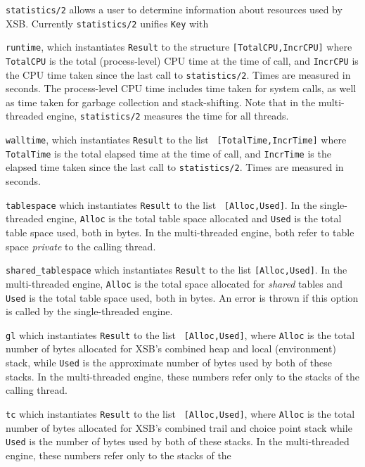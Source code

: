 \begin{description}
%
{\tt statistics/2} allows a user to determine information about
resources used by XSB.  Currently {\tt statistics/2} unifies {\tt Key}
with
\bi
\item {\tt runtime}, which instantiates {\tt Result} to the structure
  {\tt [TotalCPU,IncrCPU]} where {\tt TotalCPU} is the total
  (process-level) CPU time at the time of call, and {\tt IncrCPU} is
  the CPU time taken since the last call to {\tt statistics/2}.  Times
  are measured in seconds.  The process-level CPU time includes time
  taken for system calls, as well as time taken for garbage collection
  and stack-shifting.  Note that in the multi-threaded engine,
  {\tt statistics/2} measures the time for all threads.
%
\item {\tt walltime}, which instantiates {\tt Result} to the list {\tt
 [TotalTime,IncrTime]} where {\tt TotalTime} is the total elapsed time
 at the time of call, and {\tt IncrTime} is the elapsed time taken
 since the last call to {\tt statistics/2}.  Times are measured in
 seconds.
%
\item {\tt tablespace} which instantiates {\tt Result} to the list {\tt
 [Alloc,Used]}.  In the single-threaded engine, {\tt Alloc} is the
 total table space allocated and {\tt Used} is the total table space
 used, both in bytes.  In the multi-threaded engine, both refer to
 table space {\em private} to the calling thread.
%
\item {\tt shared\_tablespace} which instantiates {\tt Result} to the
 list {\tt [Alloc,Used]}.  In the multi-threaded engine, {\tt Alloc}
 is the total space allocated for {\em shared} tables and {\tt Used}
 is the total table space used, both in bytes.  An error is thrown if
 this option is called by the single-threaded engine.
%
\item {\tt gl} which instantiates {\tt Result} to the list {\tt
 [Alloc,Used]}, where {\tt Alloc} is the total number of bytes
 allocated for XSB's combined heap and local (environment) stack,
 while {\tt Used} is the approximate number of bytes used by both of
 these stacks.  In the multi-threaded engine, these numbers refer only
 to the stacks of the calling thread.
%
\item {\tt tc} which instantiates {\tt Result} to the list {\tt
 [Alloc,Used]}, where {\tt Alloc} is the total number of bytes
 allocated for XSB's combined trail and choice point stack while {\tt
 Used} is the number of bytes used by both of these stacks.  In the
 multi-threaded engine, these numbers refer only to the stacks of the

\end{description}
